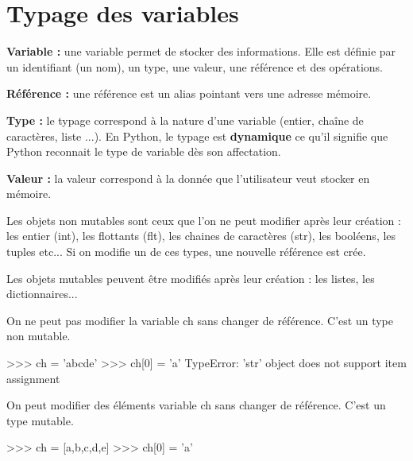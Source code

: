\documentclass[10pt]{article}
\begin{document}


\section{Typage des variables}
\begin{defi}
\textbf{Variable :} une variable permet de stocker des informations. Elle est définie par un identifiant (un nom), un type, une valeur, une référence et des opérations.

\textbf{Référence :} une référence est un alias pointant vers une adresse mémoire.

\textbf{Type :} le typage correspond à la nature d'une variable (entier, chaîne de caractères, liste ...). En Python, le typage est \textbf{dynamique} ce qu'il signifie que Python reconnait le type de variable dès son affectation.

\textbf{Valeur : } la valeur correspond à la donnée que l'utilisateur veut stocker en mémoire. 
\end{defi}

\begin{exemple}
Les objets non mutables sont ceux que l'on ne peut modifier après leur création : les entier (int), les flottants (flt), les chaines de caractères (str), les booléens, les tuples etc... Si on modifie un de ces types, une nouvelle référence est crée.

Les objets mutables peuvent être modifiés après leur création : les listes, les dictionnaires...

\begin{py}
\begin{minipage}[t]{.47\linewidth}
On ne peut pas modifier la variable \textsf{ch} sans changer de référence. C'est un type non mutable.
\begin{python}
>>> ch = 'abcde'
>>> ch[0] = 'a'
            TypeError: 'str' object does not 
            support item assignment
\end{python}
\end{minipage} \hfill
\begin{minipage}[t]{.47\linewidth}
On peut modifier des éléments variable \textsf{ch} sans changer de référence. C'est un type mutable.
\begin{python}
>>> ch = [a,b,c,d,e]
>>> ch[0] = 'a'
\end{python}
\end{minipage}
\end{py}
\end{exemple}
\end{document}
